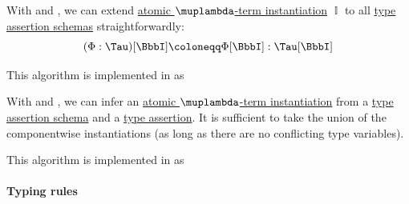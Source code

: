 \begin{algorithm}\label{alg:type_assertion_schema_instantiation}
  With  and , we can extend \hyperref[def:atomic_lambda_instantiation]{atomic \( \muplambda \)-term instantiation} \( \BbbI \) to all \hyperref[def:simple_type_assertion_schema]{type assertion schemas} straightforwardly:
  \begin{equation}\label{eq:alg:type_assertion_schema_instantiation}
    (\Phi: \Tau)[\BbbI] \coloneqq \Phi[\BbbI]: \Tau[\BbbI]
  \end{equation}
\end{algorithm}
\begin{comments}
  \item This algorithm is implemented in \cite{notebook:code} as
  \begin{CodeRefDisplay}
  \end{CodeRefDisplay}
\end{comments}

\begin{algorithm}\label{alg:type_assertion_schema_inference}
  With  and , we can infer an \hyperref[def:atomic_lambda_instantiation]{atomic \( \muplambda \)-term instantiation} from a \hyperref[def:simple_type_assertion_schema]{type assertion schema} and a \hyperref[def:type_assertion]{type assertion}. It is sufficient to take the union of the componentwise instantiations (as long as there are no conflicting type variables).
\end{algorithm}
\begin{comments}
  \item This algorithm is implemented in \cite{notebook:code} as
  \begin{CodeRefDisplay}
  \end{CodeRefDisplay}
\end{comments}

\paragraph{Typing rules}


